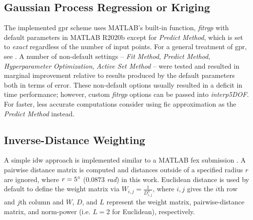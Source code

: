 \documentclass[preprint,12pt]{elsarticle}
\begin{document}
\subsection{Gaussian Process Regression or Kriging} \label{sec:methods:gpr}

The implemented \gls{gpr} scheme uses MATLAB's built-in function, \textit{fitrgp} with default parameters in MATLAB R2020b except for \textit{Predict Method}, which is set to \textit{exact} regardless of the number of input points. For a general treatment of \gls{gpr}, see \cite{}. A number of non-default settings -- \textit{Fit Method}, \textit{Predict Method}, \textit{Hyperparameter Optimization}, \textit{Active Set Method} -- were tested and resulted in marginal improvement relative to results produced by the default parameters both in terms of error. These non-default options usually resulted in a deficit in time performance; however, custom \textit{fitrgp} options can be passed into \textit{interp5DOF}. For faster, less accurate computations consider using \gls{fic} approximation as the \textit{Predict Method} instead. %


\subsection{Inverse-Distance Weighting} \label{sec:methods:idw}

A simple \gls{idw} approach is implemented similar to a MATLAB \gls{fex} submission \cite{Tovar2020}. A pairwise distance matrix is computed and distances outside of a specified radius $r$ are ignored, where $r = 5\degree$ ($0.0873$ \textit{rad}) in this work. Euclidean distance is used by default to define the weight matrix via $W_{i,j} = \frac{1}{D_{i,j}^L}$, where $i,j$ gives the $i$th row and $j$th column and $W$, $D$, and $L$ represent the weight matrix, pairwise-distance matrix, and norm-power (i.e. $L = 2$ for Euclidean), respectively.
\end{document}
